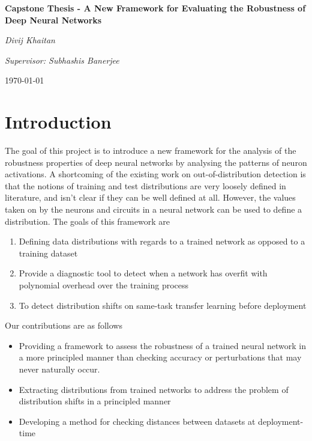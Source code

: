 \documentclass{article}
\begin{document}

    \begin{titlepage}
        \centering
        \vspace*{1in}
        {\Huge\bfseries Capstone Thesis - A New Framework for Evaluating the Robustness of Deep Neural Networks \par}
        \vspace{1.5in}
        {\Large\itshape Divij Khaitan \par}
        \vspace{1.5in}
        {\large\itshape Supervisor: Subhashis Banerjee \par}
        \vfill
        {\large \today\par}
    \end{titlepage}
    \tableofcontents
    \clearpage

    \section{Introduction}
        The goal of this project is to introduce a new framework for the analysis of the robustness properties of deep neural networks by analysing the patterns of neuron activations. A shortcoming of the existing work on out-of-distribution detection is that the notions of training and test distributions are very loosely defined in literature, and isn't clear if they can be well defined at all. However, the values taken on by the neurons and circuits in a neural network can be used to define a distribution. The goals of this framework are
        \begin{enumerate}
            \item 
                Defining data distributions with regards to a trained network as opposed to a training dataset
            \item 
                Provide a diagnostic tool to detect when a network has overfit with polynomial overhead over the training process
            \item 
                To detect distribution shifts on same-task transfer learning before deployment
        \end{enumerate}
        Our contributions are as follows 
        \begin{itemize}
                \item 
                    Providing a framework to assess the robustness of a trained neural network in a more principled manner than checking accuracy or perturbations that may never naturally occur.
                \item 
                    Extracting distributions from trained networks to address the problem of distribution shifts in a principled manner 
                \item 
                    Developing a method for checking distances between datasets at deployment-time
            \end{itemize}
\end{document}

